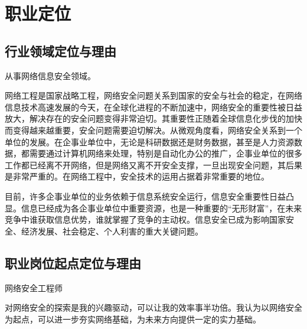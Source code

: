 \documentclass{article}
\begin{document}
\section{职业定位}

\subsection{行业领域定位与理由}
从事网络信息安全领域。\par
网络工程是国家战略工程，网络安全问题关系到国家的安全与社会的稳定，在网络信息技术高速发展的今天，在全球化进程的不断加速中，网络安全的重要性被日益放大，解决存在的安全问题变得非常迫切。其重要性正随着全球信息化步伐的加快而变得越来越重要，安全问题需要迫切解决。从微观角度看，网络安全关系到一个单位的发展。在企事业单位中，无论是科研数据还是财务数据，甚至是人力资源数据，都需要通过计算机网络来处理，特别是自动化办公的推广，企事业单位的很多工作都已经离不开网络，但是网络又离不开安全支撑，一旦出现安全问题，其后果是非常严重的。在网络工程中，安全技术的运用占据着非常重要的地位。\par
目前，许多企事业单位的业务依赖于信息系统安全运行，信息安全重要性日益凸显。信息已经成为各企事业单位中重要资源，也是一种重要的“无形财富”，在未来竞争中谁获取信息优势，谁就掌握了竞争的主动权。信息安全已成为影响国家安全、经济发展、社会稳定、个人利害的重大关键问题。\par

\subsection{职业岗位起点定位与理由}
网络安全工程师\par
对网络安全的探索是我的兴趣驱动，可以让我的效率事半功倍。我认为以网络安全为起点，可以进一步夯实网络基础，为未来方向提供一定的实力基础。\par
\end{document}
